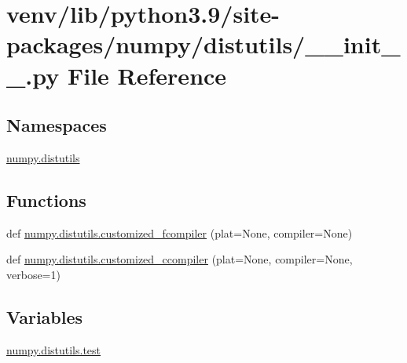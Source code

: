 \hypertarget{venv_2lib_2python3_89_2site-packages_2numpy_2distutils_2____init_____8py}{}\section{venv/lib/python3.9/site-\/packages/numpy/distutils/\+\_\+\+\_\+init\+\_\+\+\_\+.py File Reference}
\label{venv_2lib_2python3_89_2site-packages_2numpy_2distutils_2____init_____8py}
\subsection*{Namespaces}
\begin{DoxyCompactItemize}
\item 
 \hyperlink{namespacenumpy_1_1distutils}{numpy.\+distutils}
\end{DoxyCompactItemize}
\subsection*{Functions}
\begin{DoxyCompactItemize}
\item 
def \hyperlink{namespacenumpy_1_1distutils_a945ab1b3b10166278586b04b5a002a83}{numpy.\+distutils.\+customized\+\_\+fcompiler} (plat=None, compiler=None)
\item 
def \hyperlink{namespacenumpy_1_1distutils_a1bee492d455b35c6ca27a579ef52dcf3}{numpy.\+distutils.\+customized\+\_\+ccompiler} (plat=None, compiler=None, verbose=1)
\end{DoxyCompactItemize}
\subsection*{Variables}
\begin{DoxyCompactItemize}
\item 
\hyperlink{namespacenumpy_1_1distutils_acf3248fe3702808ca87d87611d278469}{numpy.\+distutils.\+test}
\end{DoxyCompactItemize}
